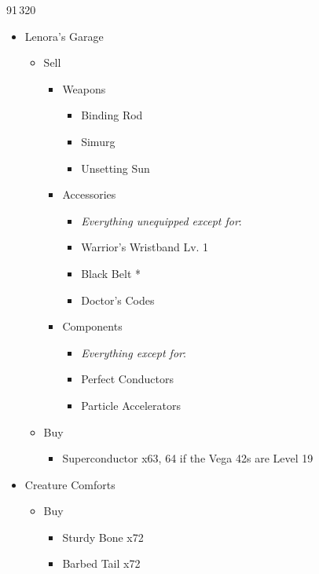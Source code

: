 \documentclass{report}
\begin{document}
\begin{shop}{91\,320}
\begin{multicols}{2}
\begin{itemize}
    \item Lenora's Garage
    \begin{itemize}
        \item Sell
        \begin{itemize}
            \item Weapons
            \begin{itemize}
                \item Binding Rod
                \item Simurg
                \item Unsetting Sun
            \end{itemize}
            \item Accessories
            \begin{itemize}
                \item \textit{Everything unequipped except for}:
                \item Warrior's Wristband Lv. 1
                \item Black Belt *
                \item Doctor's Codes
            \end{itemize}
            \item Components
            \begin{itemize}
                \item \textit{Everything except for}:
                \item Perfect Conductors
                \item Particle Accelerators
            \end{itemize}
        \end{itemize}
        \item Buy
        \begin{itemize}
            \item Superconductor x63, 64 if the Vega 42s are Level 19
        \end{itemize}
    \end{itemize}
    \item Creature Comforts
    \begin{itemize}
        \item Buy
        \begin{itemize}
            \item Sturdy Bone x72
            \item Barbed Tail x72

\end{itemize}
\end{itemize}
\end{itemize}
\end{multicols}
\end{shop}
\end{document}
